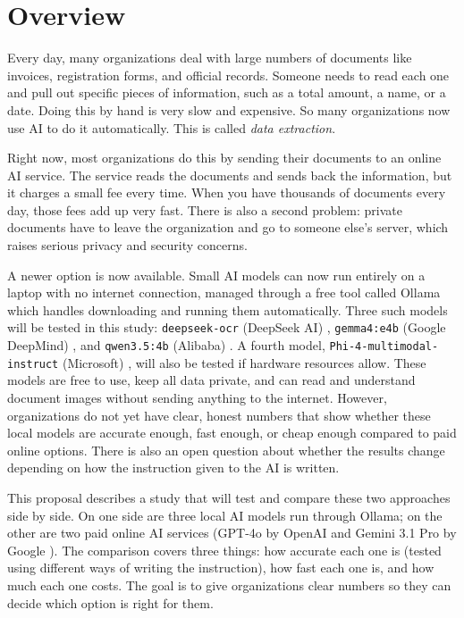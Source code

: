\section{Overview}
\label{sec:overview}

Every day, many organizations deal with large numbers of documents like invoices, registration forms, and official records. Someone needs to read each one and pull out specific pieces of information, such as a total amount, a name, or a date. Doing this by hand is very slow and expensive. So many organizations now use AI to do it automatically. This is called \textit{data extraction}.

Right now, most organizations do this by sending their documents to an online AI service. The service reads the documents and sends back the information, but it charges a small fee every time. When you have thousands of documents every day, those fees add up very fast. There is also a second problem: private documents have to leave the organization and go to someone else's server, which raises serious privacy and security concerns.

A newer option is now available. Small AI models can now run entirely on a laptop with no internet connection, managed through a free tool called Ollama \cite{ollama_2024} which handles downloading and running them automatically. Three such models will be tested in this study: \texttt{deepseek-ocr} (DeepSeek AI) \cite{deepseek_ocr_2024}, \texttt{gemma4:e4b} (Google DeepMind) \cite{gemma4_2026}, and \texttt{qwen3.5:4b} (Alibaba) \cite{qwen3_2025}. A fourth model, \texttt{Phi-4-multimodal-instruct} (Microsoft) \cite{phi4mini_2025}, will also be tested if hardware resources allow. These models are free to use, keep all data private, and can read and understand document images without sending anything to the internet. However, organizations do not yet have clear, honest numbers that show whether these local models are accurate enough, fast enough, or cheap enough compared to paid online options. There is also an open question about whether the results change depending on how the instruction given to the AI is written.

This proposal describes a study that will test and compare these two approaches side by side. On one side are three local AI models run through Ollama; on the other are two paid online AI services (GPT-4o by OpenAI \cite{openai_gpt4o_2024} and Gemini 3.1 Pro by Google \cite{google_gemini_2025}). The comparison covers three things: how accurate each one is (tested using different ways of writing the instruction), how fast each one is, and how much each one costs. The goal is to give organizations clear numbers so they can decide which option is right for them.
